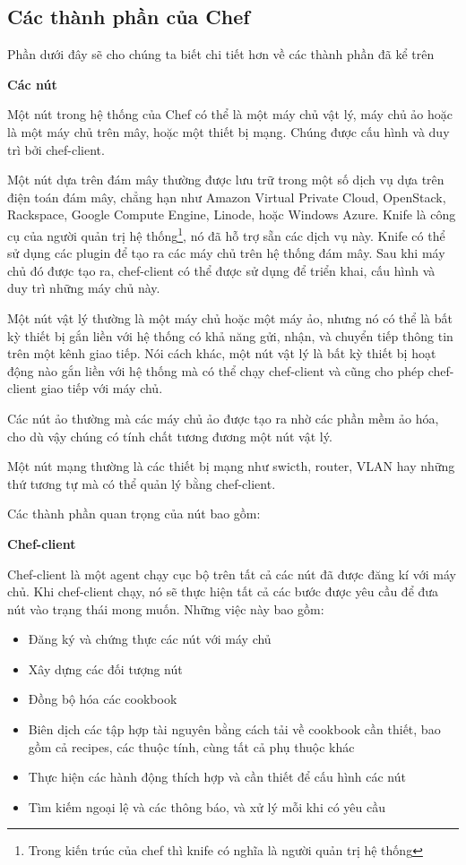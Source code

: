 \subsection{Các thành phần của Chef}
Phần dưới đây sẽ cho chúng ta biết chi tiết hơn về các thành phần đã kể trên

\textbf{\large Các nút}

Một nút trong hệ thống của Chef có thể là một máy chủ vật lý, máy chủ ảo hoặc là một máy chủ trên mây, hoặc một thiết bị mạng. Chúng được cấu hình và duy trì bởi chef-client.

Một nút dựa trên đám mây thường được lưu trữ trong một số dịch vụ dựa trên điện toán đám mây, chẳng hạn như Amazon Virtual Private Cloud, OpenStack, Rackspace, Google Compute Engine, Linode, hoặc Windows Azure. Knife là công cụ của người quản trị hệ thống\footnote{Trong kiến trúc của chef thì knife có nghĩa là người quản trị hệ thống}, nó đã hỗ trợ sẵn các dịch vụ này. Knife có thể sử dụng các plugin để tạo ra các máy chủ trên hệ thống đám mây. Sau khi máy chủ đó được tạo ra, chef-client có thể được sử dụng để triển khai, cấu hình và duy trì những máy chủ này.

Một nút vật lý thường là một máy chủ hoặc một máy ảo, nhưng nó có thể là bất kỳ thiết bị gắn liền với hệ thống có khả năng gửi, nhận, và chuyển tiếp thông tin trên một kênh giao tiếp. Nói cách khác, một nút vật lý là bất kỳ thiết bị hoạt động nào gắn liền với hệ thống mà có thể chạy chef-client và cũng cho phép chef-client giao tiếp với máy chủ.

Các nút ảo thường mà các máy chủ ảo được tạo ra nhờ các phần mềm ảo hóa, cho dù vậy chúng có tính chất tương đương một nút vật lý.

Một nút mạng thường là các thiết bị mạng như swicth, router, VLAN hay những thứ tương tự mà có thể quản lý bằng chef-client.

Các thành phần quan trọng của nút bao gồm:

\textbf{Chef-client}

Chef-client là một agent chạy cục bộ trên tất cả các nút đã được đăng kí với máy chủ. Khi chef-client chạy, nó sẽ thực hiện tất cả các bước được yêu cầu để đưa nút vào trạng thái mong muốn. Những việc này bao gồm:

\begin{itemize}
\item Đăng ký và chứng thực các nút với máy chủ
\item Xây dựng các đối tượng nút
\item Đồng bộ hóa các cookbook
\item Biên dịch các tập hợp tài nguyên bằng cách tải về cookbook cần thiết, bao gồm cả recipes, các thuộc tính, cùng tất cả phụ thuộc khác
\item Thực hiện các hành động thích hợp và cần thiết để cấu hình các nút
\item Tìm kiếm ngoại lệ và các thông báo, và xử lý mỗi khi có yêu cầu
\end{itemize}

